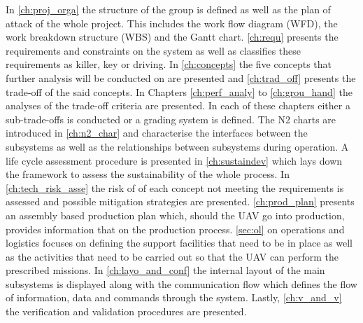 In \autoref{ch:proj_orga} the structure of the group is defined as well as the plan of attack of the whole project. This includes the work flow diagram (WFD), the work breakdown structure (WBS) and the Gantt chart. \autoref{ch:requ} presents the requirements and constraints on the system as well as classifies these requirements as killer, key or driving. In \autoref{ch:concepts} the five concepts that further analysis will be conducted on are presented and \autoref{ch:trad_off} presents the trade-off of the said concepts. In Chapters \ref{ch:perf_analy} to \ref{ch:grou_hand} the analyses of the trade-off criteria are presented. In each of these chapters either a sub-trade-offs is conducted or a grading system is defined. The N2 charts are introduced in \autoref{ch:n2_char} and characterise the interfaces between the subsystems as well as the relationships between subsystems during operation. A life cycle assessment procedure is presented in \autoref{ch:sustaindev} which lays down the framework to assess the sustainability of the whole process. In \autoref{ch:tech_risk_asse} the risk of of each concept not meeting the requirements is assessed and possible mitigation strategies are presented. \autoref{ch:prod_plan} presents an assembly based production plan which, should the UAV go into production, provides information that on the production process. \autoref{sec:ol} on operations and logistics focuses on defining the support facilities that need to be in place as well as the activities that need to be carried out so that the UAV can perform the prescribed missions. In \autoref{ch:layo_and_conf} the internal layout of the main subsystems is displayed along with the communication flow which defines the flow of information, data and commands through the system. Lastly, \autoref{ch:v_and_v} the verification and validation procedures are presented.

